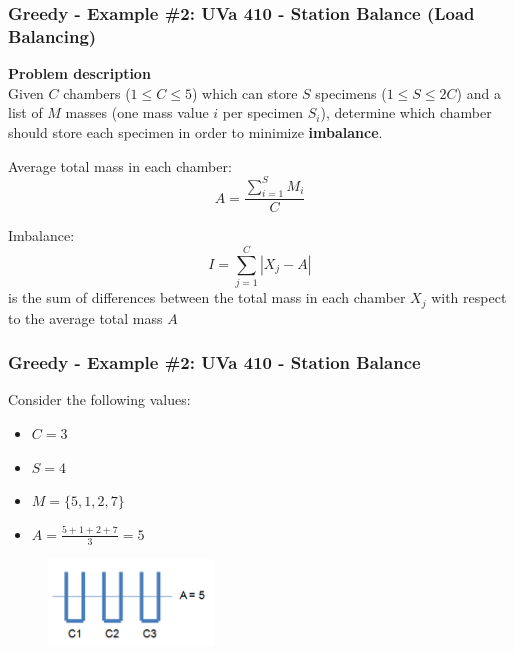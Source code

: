 \documentclass{beamer}
\begin{document}
\begin{frame}[fragile]
\frametitle{Greedy - Example \#2: UVa 410 - Station Balance (Load Balancing)}

\color{red}\textbf{Problem description}\color{black} \\

Given $C$ chambers ($1\leq C \leq 5$) which can store $S$ specimens ($1 \leq S \leq 2C$) and a list of $M$ masses (one mass value $i$ per specimen $S_i$), determine which chamber should store each specimen in order to minimize \textbf{imbalance}.

\vspace{0.3cm}

Average total mass in each chamber: $$A = \frac{\sum_{i=1}^{S}M_i}{C}$$

Imbalance: $$I = \sum_{j=1}^{C} |X_j - A|$$ is the sum of differences between the total mass in each chamber $X_j$ with respect to the average total mass $A$

\end{frame}

\begin{frame}[fragile]
\frametitle{Greedy - Example \#2: UVa 410 - Station Balance}

Consider the following values:

\begin{itemize}
    \item $C=3$
    \item $S=4$
    \item $M=\{5,1,2,7\}$
    \item $A=\frac{5+1+2+7}{3} = 5$
\end{itemize}

\begin{figure}
    \centering
    \includegraphics[scale=0.5]{imgs/uva_410_1.png}
\end{figure}

\end{frame}
\end{document}
